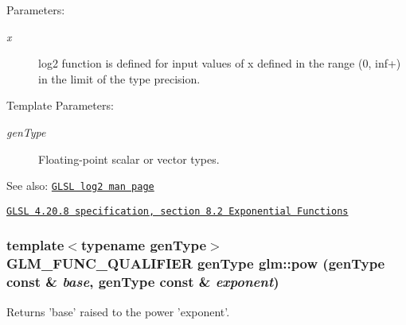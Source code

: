 \begin{Desc}
\item[Parameters:]
\begin{description}
\item[{\em x}]log2 function is defined for input values of x defined in the range (0, inf+) in the limit of the type precision. \end{description}
\end{Desc}
\begin{Desc}
\item[Template Parameters:]
\begin{description}
\item[{\em genType}]Floating-point scalar or vector types.\end{description}
\end{Desc}
\begin{Desc}
\item[See also:]\href{http://www.opengl.org/sdk/docs/manglsl/xhtml/log2.xml}{\tt GLSL log2 man page} 

\href{http://www.opengl.org/registry/doc/GLSLangSpec.4.20.8.pdf}{\tt GLSL 4.20.8 specification, section 8.2 Exponential Functions} \end{Desc}
\hypertarget{group__core__func__exponential_gfdaffc3606f4ee7f415cd64ada108356}{
\subsubsection[pow]{\setlength{\rightskip}{0pt plus 5cm}template$<$typename genType$>$ GLM\_\-FUNC\_\-QUALIFIER genType glm::pow (genType const \& {\em base}, \/  genType const \& {\em exponent})}}
\label{group__core__func__exponential_gfdaffc3606f4ee7f415cd64ada108356}


Returns 'base' raised to the power 'exponent'.


